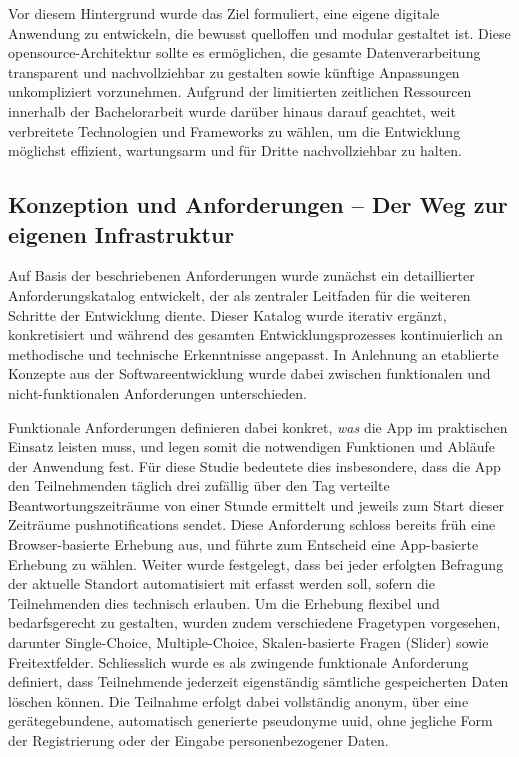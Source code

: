 Vor diesem Hintergrund wurde das Ziel formuliert, eine eigene digitale Anwendung zu entwickeln, die bewusst quelloffen und modular gestaltet ist. Diese \gls{opensource}-Architektur sollte es ermöglichen, die gesamte Datenverarbeitung transparent und nachvollziehbar zu gestalten sowie künftige Anpassungen unkompliziert vorzunehmen. Aufgrund der limitierten zeitlichen Ressourcen innerhalb der Bachelorarbeit wurde darüber hinaus darauf geachtet, weit verbreitete Technologien und Frameworks zu wählen, um die Entwicklung möglichst effizient, wartungsarm und für Dritte nachvollziehbar zu halten.

\subsection{Konzeption und Anforderungen – Der Weg zur eigenen Infrastruktur}
Auf Basis der beschriebenen Anforderungen wurde zunächst ein detaillierter Anforderungskatalog entwickelt, der als zentraler Leitfaden für die weiteren Schritte der Entwicklung diente. Dieser Katalog wurde iterativ ergänzt, konkretisiert und während des gesamten Entwicklungsprozesses kontinuierlich an methodische und technische Erkenntnisse angepasst. In Anlehnung an etablierte Konzepte aus der Softwareentwicklung wurde dabei zwischen funktionalen und nicht-funktionalen Anforderungen unterschieden.

Funktionale Anforderungen definieren dabei konkret, \textit{was} die App im praktischen Einsatz leisten muss, und legen somit die notwendigen Funktionen und Abläufe der Anwendung fest. Für diese Studie bedeutete dies insbesondere, dass die App den Teilnehmenden täglich drei zufällig über den Tag verteilte Beantwortungszeiträume von einer Stunde ermittelt und jeweils zum Start dieser Zeiträume \glspl{pushnotification} sendet. Diese Anforderung schloss bereits früh eine Browser-basierte Erhebung aus, und führte zum Entscheid eine App-basierte Erhebung zu wählen. Weiter wurde festgelegt, dass bei jeder erfolgten Befragung der aktuelle Standort automatisiert mit erfasst werden soll, sofern die Teilnehmenden dies technisch erlauben. Um die Erhebung flexibel und bedarfsgerecht zu gestalten, wurden zudem verschiedene Fragetypen vorgesehen, darunter Single-Choice, Multiple-Choice, Skalen-basierte Fragen (Slider) sowie Freitextfelder. Schliesslich wurde es als zwingende funktionale Anforderung definiert, dass Teilnehmende jederzeit eigenständig sämtliche gespeicherten Daten löschen können. Die Teilnahme erfolgt dabei vollständig anonym, über eine gerätegebundene, automatisch generierte pseudonyme \gls{uuid}, ohne jegliche Form der Registrierung oder der Eingabe personenbezogener Daten.
 
